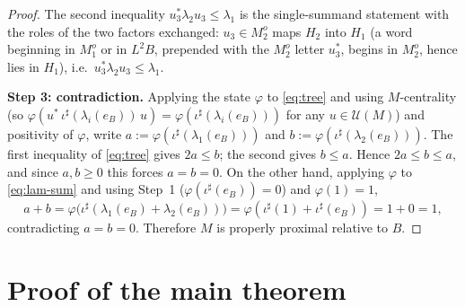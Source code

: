 \documentclass[a4paper, 11pt, reqno]{amsart}
\numberwithin{equation}{section}
\theoremstyle{plain}
\theoremstyle{remark}
\theoremstyle{definition}
\begin{document}
\begin{proof}
The second inequality $u_3^*\lambda_2 u_3\le\lambda_1$ is the single-summand statement with the roles of the two factors exchanged: $u_3\in M_2^o$ maps $H_2$ into $H_1$ (a word beginning in $M_1^o$ or in $L^2B$, prepended with the $M_2^o$ letter $u_3^*$, begins in $M_2^o$, hence lies in $H_1$), i.e.\ $u_3^*\lambda_2 u_3\le\lambda_1$.

\medskip\noindent\textbf{Step 3: contradiction.}
Applying the state $\varphi$ to \eqref{eq:tree} and using $M$-centrality (so $\varphi(u^*\,\iota^\sharp(\lambda_i(e_B))\,u)=\varphi(\iota^\sharp(\lambda_i(e_B)))$ for any $u\in\mathcal U(M)$) and positivity of $\varphi$, write $a:=\varphi(\iota^\sharp(\lambda_1(e_B)))$ and $b:=\varphi(\iota^\sharp(\lambda_2(e_B)))$. The first inequality of \eqref{eq:tree} gives $2a\le b$; the second gives $b\le a$. Hence $2a\le b\le a$, and since $a,b\ge0$ this forces $a=b=0$. On the other hand, applying $\varphi$ to \eqref{eq:lam-sum} and using Step~1 ($\varphi(\iota^\sharp(e_B))=0$) and $\varphi(1)=1$,
\[
a+b=\varphi\big(\iota^\sharp(\lambda_1(e_B)+\lambda_2(e_B))\big)=\varphi(\iota^\sharp(1)+\iota^\sharp(e_B))=1+0=1,
\]
contradicting $a=b=0$. Therefore $M$ is properly proximal relative to $B$.
\end{proof}

\section{Proof of the main theorem}
\end{document}
